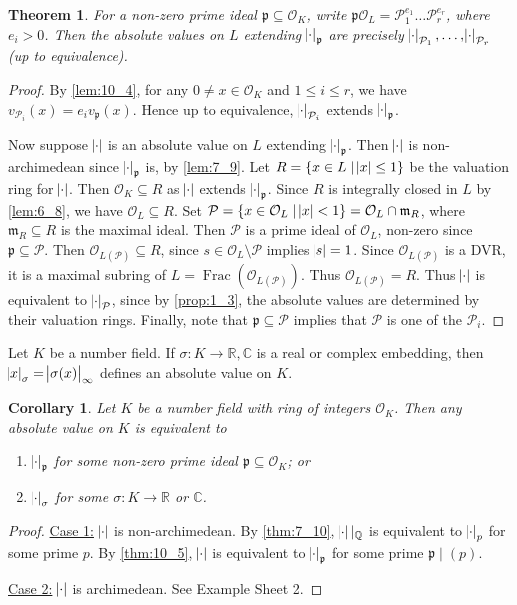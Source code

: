 \documentclass[11pt]{article}
\theoremstyle{definition}
\theoremstyle{plain}
\newtheorem{theorem}[definition]{Theorem}
\newtheorem{corollary}[definition]{Corollary}
\theoremstyle{remark}
\DeclareMathOperator{\Frac}{Frac}
\newcommand{\QQ}{\mathbb{Q}}
\newcommand{\RR}{\mathbb{R}}
\newcommand{\CC}{\mathbb{C}}
\newcommand{\cO}{\mathcal{O}}
\newcommand{\cP}{\mathcal{P}}
\newcommand{\fp}{\mathfrak{p}}
\newcommand{\fm}{\mathfrak{m}}
\begin{document}
\begin{theorem}\label{thm:10_5}
    For a non-zero prime ideal $\fp \subseteq \cO_K$, write $\fp \cO_L = \cP_1^{e_1} \ldots \cP_r^{e_r}$, where $e_i > 0$. Then the absolute values on $L$ extending $\abs{\cdot}_\fp$ are precisely $\abs{\cdot}_{\cP_1}, \ldots, \abs{\cdot}_{\cP_r}$ (up to equivalence).
\end{theorem}
\begin{proof}
    By \autoref{lem:10_4}, for any $0 \neq x \in \cO_K$ and $1 \le i \le r$, we have $v_{\cP_i}(x) = e_i v_\fp(x)$. Hence up to equivalence, $\abs{\cdot}_{\cP_i}$ extends $\abs{\cdot}_\fp$.

    Now suppose $\abs{\cdot}$ is an absolute value on $L$ extending $\abs{\cdot}_\fp$. Then $\abs{\cdot}$ is non-archimedean since $\abs{\cdot}_\fp$ is, by \autoref{lem:7_9}. Let $R = \{x \in L \mid \abs{x} \le 1\}$ be the valuation ring for $\abs{\cdot}$. Then $\cO_K \subseteq R$ as $\abs{\cdot}$ extends $\abs{\cdot}_\fp$. Since $R$ is integrally closed in $L$ by \autoref{lem:6_8}, we have $\cO_L \subseteq R$. Set $\cP = \{x \in \cO_L \mid \abs{x} < 1\} = \cO_L \cap \fm_R$, where $\fm_R \subseteq R$ is the maximal ideal. Then $\cP$ is a prime ideal of $\cO_L$, non-zero since $\fp \subseteq \cP$. Then $\cO_{L(\cP)} \subseteq R$, since $s \in \cO_L \setminus \cP$ implies $\abs{s} = 1$. Since $\cO_{L(\cP)}$ is a DVR, it is a maximal subring of $L = \Frac(\cO_{L(\cP)})$. Thus $\cO_{L(\cP)} = R$. Thus $\abs{\cdot}$ is equivalent to $\abs{\cdot}_\cP$, since by \autoref{prop:1_3}, the absolute values are determined by their valuation rings. Finally, note that $\fp \subseteq \cP$ implies that $\cP$ is one of the $\cP_i$.
\end{proof}

Let $K$ be a number field. If $\sigma : K \to \RR, \CC$ is a real or complex embedding, then $\abs{x}_\sigma = \abs{\sigma(x)}_\infty$ defines an absolute value on $K$.

\begin{corollary}\label{cor:10_6}
    Let $K$ be a number field with ring of integers $\cO_K$. Then any absolute value on $K$ is equivalent to
    \begin{enumerate}
        \item $\abs{\cdot}_\fp$ for some non-zero prime ideal $\fp \subseteq \cO_K$; or
        \item $\abs{\cdot}_\sigma$ for some $\sigma : K \to \RR$ or $\CC$.
    \end{enumerate}
\end{corollary}
\begin{proof}
    \underline{Case 1:} $\abs{\cdot}$ is non-archimedean. By \autoref{thm:7_10}, $\abs{\cdot} \vert_\QQ$ is equivalent to $\abs{\cdot}_p$ for some prime $p$. By \autoref{thm:10_5}, $\abs{\cdot}$ is equivalent to $\abs{\cdot}_\fp$ for some prime $\fp \mid (p)$.

    \underline{Case 2:} $\abs{\cdot}$ is archimedean. See Example Sheet 2.
\end{proof}
\end{document}
